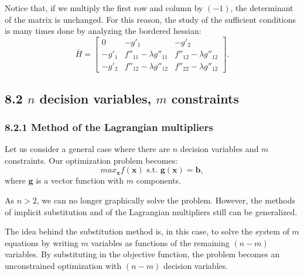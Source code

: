 \documentclass[0pt, a4paper]{article}
\begin{document}
Notice that, if we multiply the first row and column by $(-1)$, the determinant of the matrix is unchanged. For this reason, the study of the sufficient conditions is many times done by analyzing the bordered hessian:
$$
\overline{H}=
\begin{bmatrix}
0 & -g'_1 & -g'_2\\ 
-g'_1 & f''_{11}-\lambda g''_{11} & f''_{12}-\lambda g''_{12}\\ 
-g'_2 & f''_{12}-\lambda g''_{12} & f''_{22}-\lambda g''_{12}
\end{bmatrix}.
$$

\subsection*{8.2 $n$ decision variables, $m$ constraints}

\subsubsection*{8.2.1 Method of the Lagrangian multipliers}

Let us consider a general case where there are $n$ decision variables and $m$ constraints. Our optimization problem becomes:
$$max_\textbf{x} f(\textbf{x})\text{ s.t. }\textbf{g}(\textbf{x})=\textbf{b},$$
where $\textbf{g}$ is a vector function with $m$ components.

As $n>2$, we can no longer graphically solve the problem. However, the methods of implicit substitution and of the Lagrangian multipliers still can be generalized.

The idea behind the substitution method is, in this case, to solve the system of $m$ equations by writing $m$ variables as functions of the remaining $(n-m)$ variables. By substituting in the objective function, the problem becomes an unconstrained optimization with $(n-m)$ decision variables.
\end{document}

